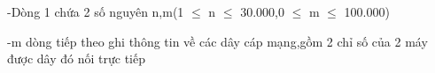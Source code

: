 -Dòng 1 chứa 2 số nguyên n,m(1 $\le$ n $\le$ 30.000,0 $\le$ m $\le$ 100.000)  

   -m dòng tiếp theo ghi thông tin về các dây cáp mạng,gồm 2 chỉ số của 2 máy được dây đó nối trực tiếp  

\